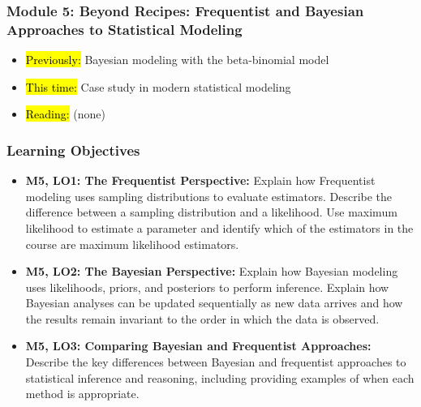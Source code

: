 
\begin{frame}
    \frametitle{Module 5: Beyond Recipes: Frequentist and Bayesian Approaches to Statistical Modeling}
    \begin{itemize}
        \item \hl{Previously: }Bayesian modeling with the beta-binomial model
        \item \hl{This time: }Case study in modern statistical modeling
        \item \hl{Reading: }(none)
    \end{itemize}

\end{frame}
\begin{frame}
    \frametitle{Learning Objectives}
    \begin{itemize}
        \item \textbf{M5, LO1: The Frequentist Perspective:} Explain how Frequentist modeling uses sampling distributions to evaluate estimators. Describe the difference between a sampling distribution and a likelihood. Use maximum likelihood to estimate a parameter and identify which of the estimators in the course are maximum likelihood estimators.
        \item \textbf{M5, LO2: The Bayesian Perspective:} Explain how Bayesian modeling uses likelihoods, priors, and posteriors to perform inference. Explain how Bayesian analyses can be updated sequentially as new data arrives and how the results remain invariant to the order in which the data is observed.
        \item \textbf{M5, LO3: Comparing Bayesian and Frequentist Approaches:} Describe the key differences between Bayesian and frequentist approaches to statistical inference and reasoning, including providing examples of when each method is appropriate.
    \end{itemize}
\end{frame}
